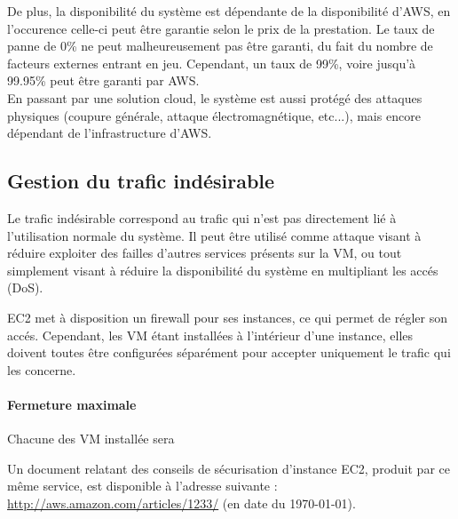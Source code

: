 De plus, la disponibilité du système est dépendante de la disponibilité d'AWS,
en l'occurence celle-ci peut être garantie selon le prix de la prestation. Le
taux de panne de 0\% ne peut malheureusement pas être garanti, du fait du
nombre de facteurs externes entrant en jeu. Cependant, un taux de 99\%, voire
jusqu'à 99.95\% peut être garanti par AWS. \\

En passant par une solution cloud, le système est aussi protégé des attaques
physiques (coupure générale, attaque électromagnétique, etc...), mais encore
dépendant de l'infrastructure d'AWS.

\subsection{Gestion du trafic indésirable}

Le trafic indésirable correspond au trafic qui n'est pas directement lié à
l'utilisation normale du système. Il peut être utilisé comme attaque visant à
réduire exploiter des failles d'autres services présents sur la VM, ou tout
simplement visant à réduire la disponibilité du système en multipliant les
accés (DoS).

EC2 met à disposition un firewall pour ses instances, ce qui permet de régler
son accés. Cependant, les VM étant installées à l'intérieur d'une instance,
elles doivent toutes être configurées séparément pour accepter uniquement le
trafic qui les concerne.

\begin{description}
    \item[] 
\end{description}

\paragraph{Fermeture maximale}

Chacune des VM installée sera 

Un document relatant des conseils de sécurisation d'instance EC2, produit par
ce même service, est disponible à l'adresse suivante :
\url{http://aws.amazon.com/articles/1233/} (en date du \today).


